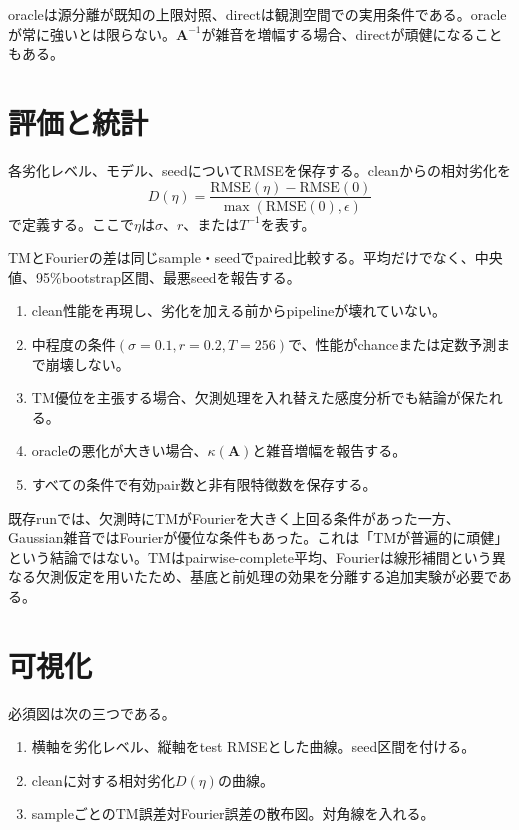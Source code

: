 \documentclass[a4paper,11pt,oneside,openany]{ltjsbook}
\newcommand{\mat}[1]{\bm{#1}}
\begin{document}
oracleは源分離が既知の上限対照、directは観測空間での実用条件である。oracleが常に強いとは限らない。\(\mat A^{-1}\)が雑音を増幅する場合、directが頑健になることもある。

\section{評価と統計}

各劣化レベル、モデル、seedについてRMSEを保存する。cleanからの相対劣化を
\begin{equation}
  D(\eta)
  =\frac{\mathrm{RMSE}(\eta)-\mathrm{RMSE}(0)}
  {\max(\mathrm{RMSE}(0),\epsilon)}
  \label{eq:relative_degradation}
\end{equation}
で定義する。ここで\(\eta\)は\(\sigma\)、\(r\)、または\(T^{-1}\)を表す。

TMとFourierの差は同じsample・seedでpaired比較する。平均だけでなく、中央値、95\%bootstrap区間、最悪seedを報告する。

\begin{gatebox}
\begin{enumerate}
  \item clean性能を再現し、劣化を加える前からpipelineが壊れていない。
  \item 中程度の条件\((\sigma=0.1,r=0.2,T=256)\)で、性能がchanceまたは定数予測まで崩壊しない。
  \item TM優位を主張する場合、欠測処理を入れ替えた感度分析でも結論が保たれる。
  \item oracleの悪化が大きい場合、\(\kappa(\mat A)\)と雑音増幅を報告する。
  \item すべての条件で有効pair数と非有限特徴数を保存する。
\end{enumerate}
\end{gatebox}

\begin{reportbox}
既存runでは、欠測時にTMがFourierを大きく上回る条件があった一方、Gaussian雑音ではFourierが優位な条件もあった。これは「TMが普遍的に頑健」という結論ではない。TMはpairwise-complete平均、Fourierは線形補間という異なる欠測仮定を用いたため、基底と前処理の効果を分離する追加実験が必要である。
\end{reportbox}

\section{可視化}

必須図は次の三つである。

\begin{enumerate}
  \item 横軸を劣化レベル、縦軸をtest RMSEとした曲線。seed区間を付ける。
  \item cleanに対する相対劣化\(D(\eta)\)の曲線。
  \item sampleごとのTM誤差対Fourier誤差の散布図。対角線を入れる。
\end{enumerate}
\end{document}
